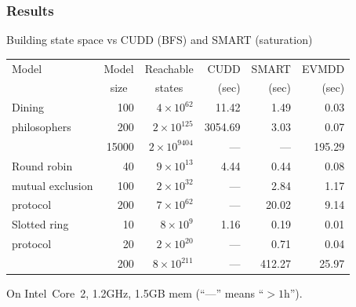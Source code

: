 \documentclass{beamer}
\begin{document}
\begin{frame}
  \frametitle{Results}

  Building state space vs CUDD (BFS) and SMART (saturation)
  \vspace{-3.7mm}
  \begin{center}
    \begin{tabular}{|l|r||r||r|r|r|}
      \hline
      {\footnotesize Model} & \multicolumn{1}{|c||}{\footnotesize Model} & \multicolumn{1}{c||}{\footnotesize Reachable} & {\footnotesize CUDD} & {\footnotesize SMART} & {\footnotesize EVMDD} \\
      & \multicolumn{1}{|c||}{\footnotesize size}  & \multicolumn{1}{c||}{\footnotesize states}  & {\footnotesize (sec)} & {\footnotesize (sec)} & {\footnotesize (sec)} \\
      \hline
      \hline
      {\footnotesize Dining} & 100 & $4\times10^{62}$ &   11.42 &    1.49 &    0.03 \\
      {\footnotesize philosophers} & 200 & $2\times10^{125}$ & 3054.69 &    3.03 &    0.07 \\
      & 15000 & $2\times10^{9404}$ &   --- &   --- &  195.29 \\
      \hline
      \hline
      {\footnotesize Round robin} & 40 & $9\times10^{13}$ &    4.44 &    0.44 &    0.08 \\
      {\footnotesize mutual exclusion} & 100 & $2\times10^{32}$ &   --- &    2.84 &    1.17 \\
      {\footnotesize protocol} & 200 & $7\times10^{62}$ &   --- &   20.02 &    9.14 \\
      \hline
      \hline
      {\footnotesize Slotted ring} & 10 & $8\times10^{9}$   &  1.16 &    0.19 &    0.01 \\
      {\footnotesize protocol}     & 20 & $2\times10^{20}$  &   --- &    0.71 &    0.04 \\
      {\footnotesize}             & 200 & $8\times10^{211}$ &   --- &  412.27 &   25.97 \\
      \hline
    \end{tabular}
    On Intel~Core~2, 1.2GHz, 1.5GB mem (``---'' means ``$>1$h'').
  \end{center}

\end{frame}
\end{document}
